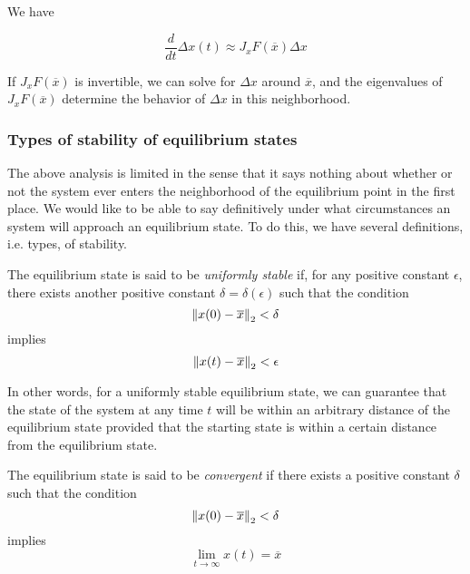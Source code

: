 We have

\begin{equation*}
\frac{d}{dt}\Delta x(t) \approx J_x F(\overline{x}) \Delta x
\end{equation*}

If $J_x F(\overline{x})$ is invertible, we can solve for $\Delta x$ around $\overline{x}$, and the eigenvalues of $J_x F(\overline{x})$ determine the behavior of $\Delta x$ in this neighborhood.

\subsubsection{Types of stability of equilibrium states}

The above analysis is limited in the sense that it says nothing about whether or not the system ever enters the neighborhood of the equilibrium point in the first place. We would like to be able to say definitively under what circumstances an system will approach an equilibrium state. To do this, we have several definitions, i.e. types, of stability.

\begin{definition}
  The equilibrium state is said to be \emph{uniformly stable} if, for any positive constant $\epsilon$, there exists another positive constant $\delta = \delta(\epsilon)$ such that the condition
  \begin{equation*}
    \left\lVert x(0) - \overline{x} \right\rVert_2 < \delta
  \end{equation*}
  implies 
  \begin{equation*}
    \left\lVert x(t) - \overline{x} \right\rVert_2 < \epsilon
  \end{equation*}
  \cite[p. 681]{Haykin:2009:NNC:1213811}
\end{definition}

In other words, for a uniformly stable equilibrium state, we can guarantee that the state of the system at any time $t$ will be within an arbitrary distance of the equilibrium state provided that the starting state is within a certain distance from the equilibrium state.

\begin{definition}
  The equilibrium state is said to be \emph{convergent} if there exists a positive constant $\delta$ such that the condition
  \begin{equation*}
    \left\lVert x(0) - \overline{x} \right\rVert_2 < \delta
  \end{equation*}
  implies 
  \begin{equation*}
    \lim_{t \to \infty} x(t) = \overline{x}
  \end{equation*}
  \cite[p. 681]{Haykin:2009:NNC:1213811}
\end{definition}

